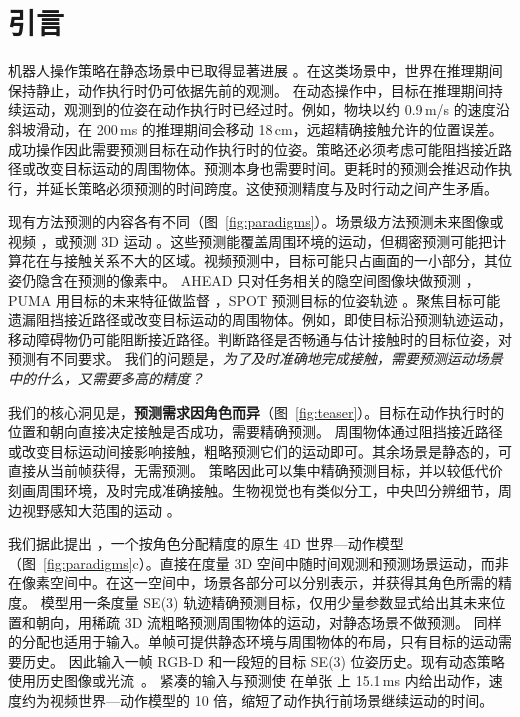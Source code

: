 \section{引言}
\label{sec:introduction}

机器人操作策略在静态场景中已取得显著进展 \cite{diffusionpolicy,pi05}。在这类场景中，世界在推理期间保持静止，动作执行时仍可依据先前的观测。
在动态操作中，目标在推理期间持续运动，观测到的位姿在动作执行时已经过时。例如，物块以约 0.9\,m/s 的速度沿斜坡滑动，在 200\,ms 的推理期间会移动 18\,cm，远超精确接触允许的位置误差。
成功操作因此需要预测目标在动作执行时的位姿。策略还必须考虑可能阻挡接近路径或改变目标运动的周围物体。预测本身也需要时间。更耗时的预测会推迟动作执行，并延长策略必须预测的时间跨度。这使预测精度与及时行动之间产生矛盾。

现有方法预测的内容各有不同（图~\ref{fig:paradigms}）。场景级方法预测未来图像或视频 \cite{dbctfp,dreamzero,openwam_alpha,dynamicwam}，或预测 3D 运动 \cite{physmani}。这些预测能覆盖周围环境的运动，但稠密预测可能把计算花在与接触关系不大的区域。视频预测中，目标可能只占画面的一小部分，其位姿仍隐含在预测的像素中。
AHEAD 只对任务相关的隐空间图像块做预测 \cite{ahead}，PUMA 用目标的未来特征做监督 \cite{domino}，SPOT 预测目标的位姿轨迹 \cite{spot}。聚焦目标可能遗漏阻挡接近路径或改变目标运动的周围物体。例如，即使目标沿预测轨迹运动，移动障碍物仍可能阻断接近路径。判断路径是否畅通与估计接触时的目标位姿，对预测有不同要求。
我们的问题是，\emph{为了及时准确地完成接触，需要预测运动场景中的什么，又需要多高的精度？}



我们的核心洞见是，\textbf{预测需求因角色而异}（图~\ref{fig:teaser}）。目标在动作执行时的位置和朝向直接决定接触是否成功，需要精确预测。
周围物体通过阻挡接近路径或改变目标运动间接影响接触，粗略预测它们的运动即可。其余场景是静态的，可直接从当前帧获得，无需预测。
策略因此可以集中精确预测目标，并以较低代价刻画周围环境，及时完成准确接触。生物视觉也有类似分工，中央凹分辨细节，周边视野感知大范围的运动 \cite{curcio1990photoreceptor,strasburger2011peripheral,rosenholtz2016peripheral}。

我们据此提出 \textbf{\ours}，一个按角色分配精度的原生 4D 世界—动作模型（图~\ref{fig:paradigms}c）。\ours 直接在度量 3D 空间中随时间观测和预测场景运动，而非在像素空间中。在这一空间中，场景各部分可以分别表示，并获得其角色所需的精度。
模型用一条度量 SE(3) 轨迹精确预测目标，仅用少量参数显式给出其未来位置和朝向，用稀疏 3D 流粗略预测周围物体的运动，对静态场景不做预测。
同样的分配也适用于输入。单帧可提供静态环境与周围物体的布局，只有目标的运动需要历史。
\ours 因此输入一帧 RGB-D 和一段短的目标 SE(3) 位姿历史。现有动态策略使用历史图像或光流~\cite{dynamicvla,domino,dynamicwam}。
紧凑的输入与预测使 \ours 在单张 \cfgGPU{} 上 15.1\,ms 内给出动作，速度约为视频世界—动作模型的 10 倍，缩短了动作执行前场景继续运动的时间。

